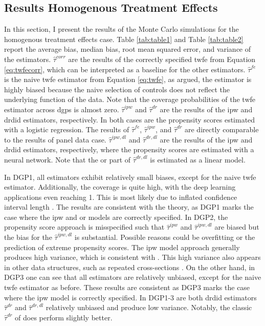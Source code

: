 \subsection{Results Homogenous Treatment Effects}



In this section, I present the results of the Monte Carlo simulations for the homogenous treatment effects case.
Table \ref{tab:table1} and Table \ref{tab:table2} report the average bias, median bias, root mean squared error, and variance of the estimators.
$\hat{\tau}^{corr}$ are the results of the correctly specified \ac{twfe} from Equation \ref{eq:twfecorr}, which can be interpreted as a baseline for the other estimators.
$\hat{\tau}^{fe}$ is the naive \ac{twfe} estimator from Equation \ref{eq:twfe}, as argued, the estimator is highly biased because the naive selection of controls does not reflect the underlying function of the data.
Note that the coverage probabilities of the \ac{twfe} estimator across \ac{dgp}s is almost zero.
$\hat{\tau}^{ipw}$ and $\hat{\tau}^{dr}$ are the results of the \ac{ipw} and \ac{drdid} estimators, respectively.
In both cases are the propensity scores estimated with a logistic regression.
The results of $\hat{\tau}^{fe}$, $\hat{\tau}^{ipw}$, and $\hat{\tau}^{dr}$ are directly comparable to the results of \citet{santannaDoublyRobustDifferenceindifferences2020} panel data case.
$\hat{\tau}^{ipw,dl}$ and $\hat{\tau}^{dr,dl}$ are the results of the \ac{ipw} and \ac{drdid} estimators, respectively, where the propensity scores are estimated with a neural network.
Note that the \ac{or} part of $\hat{\tau}^{dr,dl}$ is estimated as a linear model.

In DGP1, all estimators exhibit relatively small biases, except for the naive \ac{twfe} estimator.
Additionally, the coverage is quite high, with the deep learning applications even reaching 1.
This is most likely due to inflated confidence interval length \citep{farrellDeepNeuralNetworks2021}.
The results are consistent with the theory, as DGP1 marks the case where the \ac{ipw} and \ac{or} models are correctly specified.
In DGP2, the propensity score approach is misspecified such that $\hat{\tau}^{ipw}$ and $\hat{\tau}^{ipw,dl}$ are biased but the bias for the  $\hat{\tau}^{ipw,dl}$ is substantial.
Possible reasons could be overfitting or the prediction of extreme propensity scores.
The \ac{ipw} model approach generally produces high variance, which is consistent with \citet{santannaDoublyRobustDifferenceindifferences2020}.
This high variance also appears in other data structures, such as repeated cross-sections \citep{santannaDoublyRobustDifferenceindifferences2020, manfeDifferenceInDifferenceDesignRepeated}.
On the other hand, in DGP3 one can see that all estimators are relatively unbiased, except for the naive \ac{twfe} estimator as before.
These results are consistent as DGP3 marks the case where the \ac{ipw} model is correctly specified.
In DGP1-3 are both \ac{drdid} estimators $\hat{\tau}^{dr}$ and $\hat{\tau}^{dr,dl}$ relatively unbiased and produce low variance.
Notably, the classic $\hat{\tau}^{dr}$ of \citet{santannaDoublyRobustDifferenceindifferences2020} does perform slightly better.

